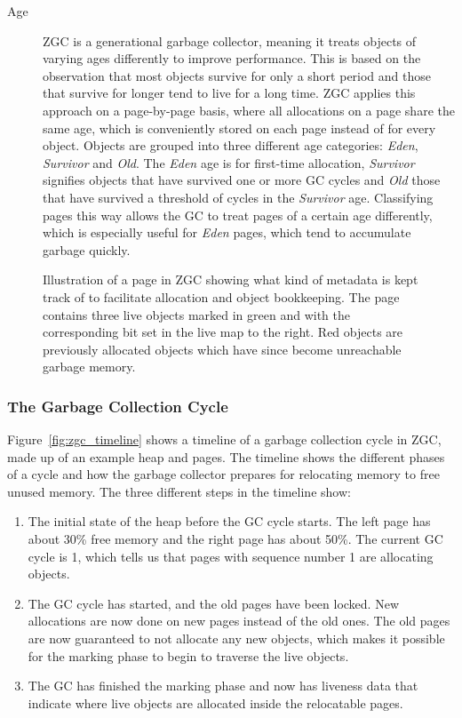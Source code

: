 \begin{description}
    \item[Age]
        ZGC is a generational garbage collector, meaning it treats objects of varying ages differently to improve performance. This is based on the observation that most objects survive for only a short period and those that survive for longer tend to live for a long time. ZGC applies this approach on a page-by-page basis, where all allocations on a page share the same age, which is conveniently stored on each page instead of for every object. Objects are grouped into three different age categories: \textit{Eden}, \textit{Survivor} and \textit{Old}. The \textit{Eden} age is for first-time allocation, \textit{Survivor} signifies objects that have survived one or more GC cycles and \textit{Old} those that have survived a threshold of cycles in the \textit{Survivor} age. Classifying pages this way allows the GC to treat pages of a certain age differently, which is especially useful for \textit{Eden} pages, which tend to accumulate garbage quickly.
\end{description}

\begin{figure}[H]
    \centering
    
    \caption{Illustration of a page in ZGC showing what kind of metadata is kept track of to facilitate allocation and object bookkeeping. The page contains three live objects marked in green and with the corresponding bit set in the live map to the right. Red objects are previously allocated objects which have since become unreachable garbage memory.}
    \label{fig:zpages}
\end{figure}

\subsubsection{The Garbage Collection Cycle}

Figure~\ref{fig:zgc_timeline} shows a timeline of a garbage collection cycle in ZGC, made up of an example heap and pages. The timeline shows the different phases of a cycle and how the garbage collector prepares for relocating memory to free unused memory. The three different steps in the timeline show:

\vspace*{-0.4cm}

\begin{enumerate}[label=\alph*)]
    \item The initial state of the heap before the GC cycle starts. The left page has about 30\% free memory and the right page has about 50\%. The current GC cycle is 1, which tells us that pages with sequence number 1 are allocating objects.
    \item The GC cycle has started, and the old pages have been locked. New allocations are now done on new pages instead of the old ones. The old pages are now guaranteed to not allocate any new objects, which makes it possible for the marking phase to begin to traverse the live objects.
    \item The GC has finished the marking phase and now has liveness data that indicate where live objects are allocated inside the relocatable pages.
\end{enumerate}

